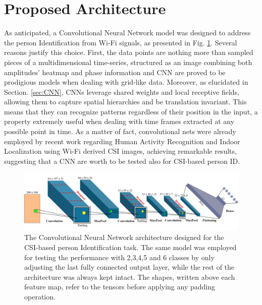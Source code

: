 \documentclass[binding=0.7cm, oneside]{sapthesis}
\begin{document}
\section{Proposed Architecture}
As anticipated, a Convolutional Neural Network model was designed to address the person Identification from Wi-Fi signals, as presented in Fig. \ref{fig:model}. Several reasons justify this choice. First, the data points are nothing more than sampled pieces of a multidimensional time-series,
structured as an image combining both amplitudes' heatmap and phase information and CNN are proved to be prodigious models when dealing with grid-like data. Moreover, as elucidated in Section. \ref{sec:CNN}, CNNs leverage shared weights and local receptive fields, allowing them to capture spatial
hierarchies and be translation invariant. This means that they can recognize patterns regardless of their position in the input, a property extremely useful when dealing with time frames extracted at any possible point in time. As a matter of fact, convolutional nets were already employed by recent work
regarding Human Activity Recognition \cite{cnn_csi_activity} and Indoor Localization \cite{cnn_csi_localization} using Wi-Fi derived CSI images, achieving remarkable results, suggesting that a CNN are worth to be tested also for CSI-based person ID.
\begin{figure}[h]
    \centering
    \includegraphics[width=\textwidth]{images/convNet.png}
    \caption{The Convolutional Neural Network architecture designed for the CSI-based person Identification task.
        The same model was employed for testing the performance with 2,3,4,5 and 6 classes by only adjusting the last fully connected output layer, while the rest
        of the architecture was always kept intact. The shapes, written above each feature map, refer to the tensors before applying any padding operation.}
    \label{fig:model}
\end{figure}
\end{document}
